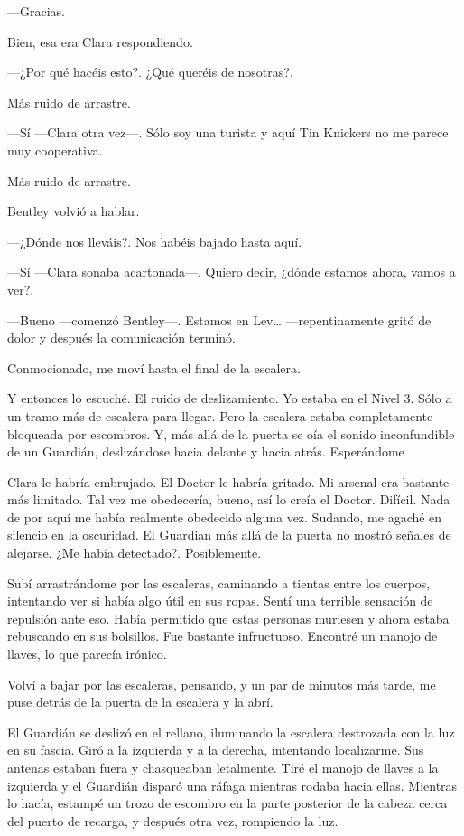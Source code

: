 ---Gracias.

Bien, esa era Clara respondiendo.

---¿Por qué hacéis esto?. ¿Qué queréis de nosotras?.

Más ruido de arrastre.

---Sí ---Clara otra vez---. Sólo soy una turista y aquí Tin Knickers no
me parece muy cooperativa.

Más ruido de arrastre.

Bentley volvió a hablar.

---¿Dónde nos lleváis?. Nos habéis bajado hasta aquí.

---Sí ---Clara sonaba acartonada---. Quiero decir, ¿dónde estamos ahora,
vamos a ver?.

---Bueno ---comenzó Bentley---. Estamos en Lev\ldots{} ---repentinamente
gritó de dolor y después la comunicación terminó.

Conmocionado, me moví hasta el final de la escalera.

Y entonces lo escuché. El ruido de deslizamiento. Yo estaba en el Nivel
3. Sólo a un tramo más de escalera para llegar. Pero la escalera estaba
completamente bloqueada por escombros. Y, más allá de la puerta se oía
el sonido inconfundible de un Guardián, deslizándose hacia delante y
hacia atrás. Esperándome

Clara le habría embrujado. El Doctor le habría gritado. Mi arsenal era
bastante más limitado. Tal vez me obedecería, bueno, así lo creía el
Doctor. Difícil. Nada de por aquí me había realmente obedecido alguna
vez. Sudando, me agaché en silencio en la oscuridad. El Guardian más
allá de la puerta no mostró señales de alejarse. ¿Me había detectado?.
Posiblemente.

Subí arrastrándome por las escaleras, caminando a tientas entre los
cuerpos, intentando ver si había algo útil en sus ropas. Sentí una
terrible sensación de repulsión ante eso. Había permitido que estas
personas muriesen y ahora estaba rebuscando en sus bolsillos. Fue
bastante infructuoso. Encontré un manojo de llaves, lo que parecía
irónico.

Volví a bajar por las escaleras, pensando, y un par de minutos más
tarde, me puse detrás de la puerta de la escalera y la abrí.

El Guardián se deslizó en el rellano, iluminando la escalera destrozada
con la luz en su fascia. Giró a la izquierda y a la derecha, intentando
localizarme. Sus antenas estaban fuera y chasqueaban letalmente. Tiré el
manojo de llaves a la izquierda y el Guardián disparó una ráfaga
mientras rodaba hacia ellas. Mientras lo hacía, estampé un trozo de
escombro en la parte posterior de la cabeza cerca del puerto de recarga,
y después otra vez, rompiendo la luz.

